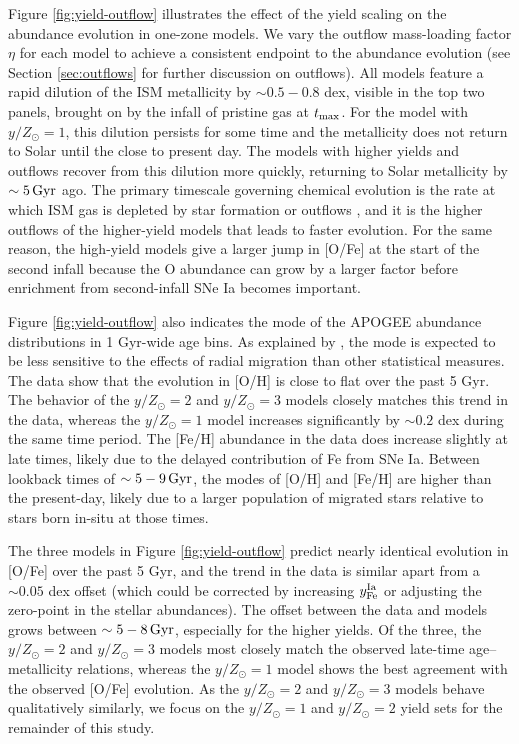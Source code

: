 \documentclass[twocolumn,twocolappendix,linenumbers]{aastex631}
\newcommand{\yZ}[1]{$y/Z_\odot=#1$}
\begin{document}
Figure \ref{fig:yield-outflow} illustrates the effect of the yield scaling on the abundance evolution in one-zone models. We vary the outflow mass-loading factor $\eta$ for each model to achieve a consistent endpoint to the abundance evolution (see Section \ref{sec:outflows} for further discussion on outflows). All models feature a rapid dilution of the ISM metallicity by $\sim0.5-0.8$ dex, visible in the top two panels, brought on by the infall of pristine gas at $t_{\rm max}$. For the model with $y/Z_\odot=1$, this dilution persists for some time and the metallicity does not return to Solar until the close to present day. The models with higher yields and outflows recover from this dilution more quickly, returning to Solar metallicity by $\sim5\,{\rm Gyr}$ ago. 
The primary timescale governing chemical evolution is the rate at which ISM gas is depleted by star formation or outflows \citep{weinberg_equilibrium_2017}, and it is the higher outflows of the higher-yield models that leads to faster evolution. For the same reason, the high-yield models give a larger jump in [O/Fe] at the start of the second infall because the O abundance can grow by a larger factor before enrichment from second-infall SNe Ia becomes important.

Figure \ref{fig:yield-outflow} also indicates the mode of the APOGEE abundance distributions in 1 Gyr-wide age bins. As explained by \citet{johnson_milky_2024}, the mode is expected to be less sensitive to the effects of radial migration than other statistical measures. The data show that the evolution in [O/H] is close to flat over the past 5 Gyr. The behavior of the $y/Z_\odot=2$ and $y/Z_\odot=3$ models closely matches this trend in the data, whereas the $y/Z_\odot=1$ model increases significantly by $\sim0.2$ dex during the same time period. The [Fe/H] abundance in the data does increase slightly at late times, likely due to the delayed contribution of Fe from SNe Ia. Between lookback times of $\sim5-9\,{\rm Gyr}$, the modes of [O/H] and [Fe/H] are higher than the present-day, likely due to a larger population of migrated stars relative to stars born in-situ at those times. 

The three models in Figure \ref{fig:yield-outflow} predict nearly identical evolution in [O/Fe] over the past 5 Gyr, and the trend in the data is similar apart from a $\sim0.05$ dex offset (which could be corrected by increasing $y_{\rm Fe}^{\rm Ia}$ or adjusting the zero-point in the stellar abundances). The offset between the data and models grows between $\sim5-8\,{\rm Gyr}$, especially for the higher yields. Of the three, the \yZ{2} and \yZ{3} models most closely match the observed late-time age--metallicity relations, whereas the \yZ{1} model shows the best agreement with the observed [O/Fe] evolution. As the \yZ{2} and \yZ{3} models behave qualitatively similarly, we focus on the \yZ{1} and \yZ{2} yield sets for the remainder of this study.
\end{document}
